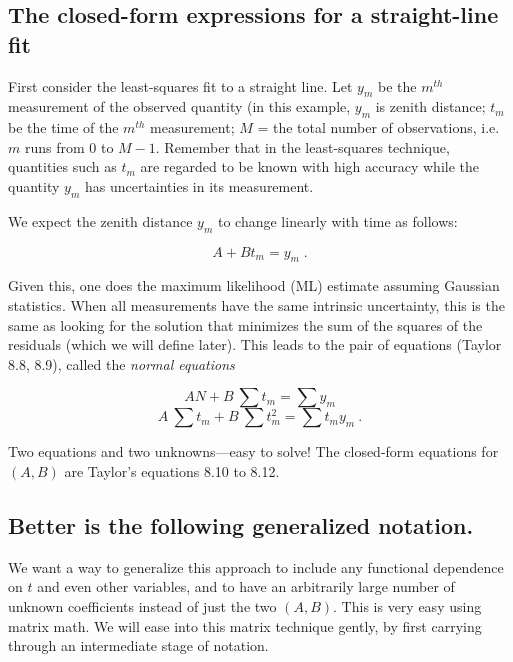\documentclass[psfig,preprint]{aastex}
\begin{document}
\subsection{The closed-form expressions for a straight-line fit}

	First consider the least-squares fit to a straight line.  Let
$y_m$ be the $m^{th}$ measurement of the observed quantity (in this
example, $y_m$ is zenith distance; $t_m$ be the time of the
$m^{th}$ measurement; $M$ = the total number of observations, i.e.\ $m$
runs from 0 to $M-1$.  Remember that in the least-squares technique,
quantities such as $t_m$ are regarded to be known with high accuracy
while the quantity $y_m$ has uncertainties in its measurement. 

	We expect the zenith distance $y_m$ to change linearly with
time as follows:

\begin{equation} \label{one}
A + B t_m = y_m \; .
\end{equation}

\noindent Given this, one does the maximum likelihood (ML) estimate assuming
Gaussian statistics. When all measurements have the same intrinsic
uncertainty, this is the same as looking for the solution that minimizes
the sum of the squares of the residuals (which we will define later). 
This leads to the pair of equations (Taylor 8.8, 8.9), called the {\it
normal equations}

\begin{mathletters} \label{normalone}
\begin{equation}
AN + B \ \sum t_m = \sum y_m
\end{equation}
\begin{equation}
A \ \sum t_m + B \ \sum t_m^2 = \sum t_m y_m \ .
\end{equation}
\end{mathletters}

\noindent Two equations and two unknowns---easy to solve! The
closed-form equations for $(A,B)$ are Taylor's equations 8.10 to 8.12.

\subsection{Better is the following generalized notation.}

	We want a way to generalize this approach to include any
functional dependence on $t$ and even other variables, and to have an
arbitrarily large number of unknown coefficients instead of just the two
$(A,B)$. This is very easy using matrix math.  We will ease into this
matrix technique gently, by first  carrying through an intermediate
stage of notation. 
\end{document}
